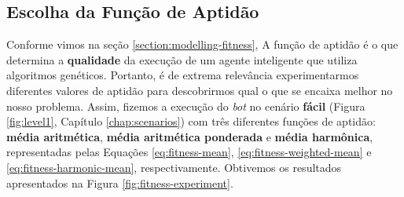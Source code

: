 \subsection{\label{section:fitness-experiment}Escolha da Função de Aptidão}
Conforme vimos na seção \ref{section:modelling-fitness}, A função de aptidão é o
que determina a \textbf{qualidade} da execução de um agente inteligente que
utiliza algoritmos genéticos. Portanto, é de extrema relevância experimentarmos
diferentes valores de aptidão para descobrirmos qual o que se encaixa melhor no
nosso problema. Assim, fizemos a execução do \textit{bot} no cenário
\textbf{fácil} (Figura \ref{fig:level1}, Capítulo \ref{chap:scenarios}) com três
diferentes funções de aptidão: \textbf{média aritmética}, \textbf{média
aritmética ponderada} e \textbf{média harmônica}, representadas pelas Equações
\ref{eq:fitness-mean}, \ref{eq:fitness-weighted-mean} e
\ref{eq:fitness-harmonic-mean}, respectivamente. Obtivemos os resultados
apresentados na Figura \ref{fig:fitness-experiment}.

